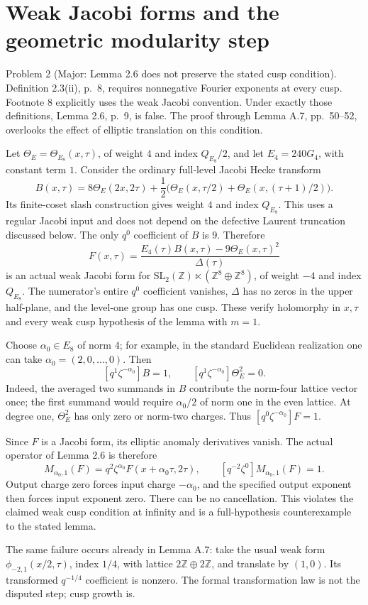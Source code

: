 \documentclass[10pt]{article}
\begin{document}
\section*{Weak Jacobi forms and the geometric modularity step}
Problem 2 (Major: Lemma 2.6 does not preserve the stated cusp condition).  Definition 2.3(ii), p. 8, requires nonnegative Fourier exponents at every cusp. Footnote 8 explicitly uses the weak Jacobi convention. Under exactly those definitions, Lemma 2.6, p. 9, is false. The proof through Lemma A.7, pp. 50–52, overlooks the effect of elliptic translation on this condition.\par
Let \(\Theta_E=\Theta_{E_8}(x,\tau)\), of weight \(4\) and index \(Q_{E_8}/2\), and let \(E_4=240G_4\), with constant term \(1\). Consider the ordinary full-level Jacobi Hecke transform \[B(x,\tau)=8\Theta_E(2x,2\tau)
 +\frac12\bigl(\Theta_E(x,\tau/2)
                  +\Theta_E(x,(\tau+1)/2)\bigr).\] Its finite-coset slash construction gives weight \(4\) and index \(Q_{E_8}\). This uses a regular Jacobi input and does not depend on the defective Laurent truncation discussed below. The only \(q^0\) coefficient of \(B\) is \(9\). Therefore \[F(x,\tau)=\frac{E_4(\tau)B(x,\tau)-9\Theta_E(x,\tau)^2}
                  {\Delta(\tau)}\] is an actual weak Jacobi form for \(\mathrm{SL}_2(\mathbb Z)\ltimes(\mathbb Z^8\oplus\mathbb Z^8)\), of weight \(-4\) and index \(Q_{E_8}\). The numerator’s entire \(q^0\) coefficient vanishes, \(\Delta\) has no zeros in the upper half-plane, and the level-one group has one cusp. These verify holomorphy in \(x,\tau\) and every weak cusp hypothesis of the lemma with \(m=1\).\par
Choose \(\alpha_0\in E_8\) of norm \(4\); for example, in the standard Euclidean realization one can take \(\alpha_0=(2,0,\ldots,0)\). Then \[[q^1\zeta^{-\alpha_0}]B=1,\qquad
 [q^1\zeta^{-\alpha_0}]\Theta_E^2=0.\] Indeed, the averaged two summands in \(B\) contribute the norm-four lattice vector once; the first summand would require \(\alpha_0/2\) of norm one in the even lattice. At degree one, \(\Theta_E^2\) has only zero or norm-two charges. Thus \([q^0\zeta^{-\alpha_0}]F=1\).\par
Since \(F\) is a Jacobi form, its elliptic anomaly derivatives vanish. The actual operator of Lemma 2.6 is therefore \[M_{\alpha_0,1}(F)
   =q^2\zeta^{\alpha_0}F(x+\alpha_0\tau,2\tau),
 \qquad
 [q^{-2}\zeta^0]M_{\alpha_0,1}(F)=1.\] Output charge zero forces input charge \(-\alpha_0\), and the specified output exponent then forces input exponent zero. There can be no cancellation. This violates the claimed weak cusp condition at infinity and is a full-hypothesis counterexample to the stated lemma.\par
The same failure occurs already in Lemma A.7: take the usual weak form \(\phi_{-2,1}(x/2,\tau)\), index \(1/4\), with lattice \(2\mathbb Z\oplus2\mathbb Z\), and translate by \((1,0)\). Its transformed \(q^{-1/4}\) coefficient is nonzero. The formal transformation law is not the disputed step; cusp growth is.\par
\end{document}
